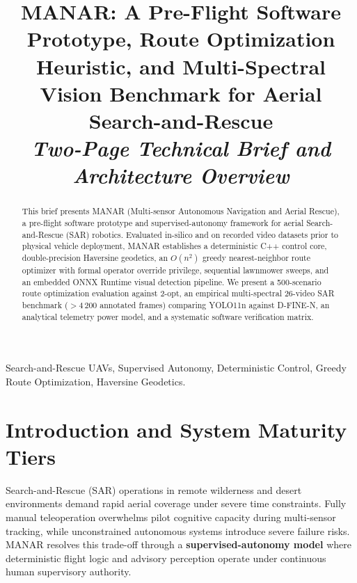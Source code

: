 \documentclass[conference]{IEEEtran}
\begin{document}
\title{MANAR: A Pre-Flight Software Prototype, Route Optimization Heuristic, and Multi-Spectral Vision Benchmark for Aerial Search-and-Rescue\\
\Large\textit{Two-Page Technical Brief and Architecture Overview}}

\author{
}

\maketitle

\begin{abstract}
This brief presents MANAR (Multi-sensor Autonomous Navigation and Aerial Rescue), a pre-flight software prototype and supervised-autonomy framework for aerial Search-and-Rescue (SAR) robotics. Evaluated in-silico and on recorded video datasets prior to physical vehicle deployment, MANAR establishes a deterministic C++ control core, double-precision Haversine geodetics, an $O(n^2)$ greedy nearest-neighbor route optimizer with formal operator override privilege, sequential lawnmower sweeps, and an embedded ONNX Runtime visual detection pipeline. We present a 500-scenario route optimization evaluation against 2-opt, an empirical multi-spectral 26-video SAR benchmark ($>4\,200$ annotated frames) comparing YOLO11n against D-FINE-N, an analytical telemetry power model, and a systematic software verification matrix.
\end{abstract}

\begin{IEEEkeywords}
Search-and-Rescue UAVs, Supervised Autonomy, Deterministic Control, Greedy Route Optimization, Haversine Geodetics.
\end{IEEEkeywords}

\section{Introduction and System Maturity Tiers}
Search-and-Rescue (SAR) operations in remote wilderness and desert environments demand rapid aerial coverage under severe time constraints. Fully manual teleoperation overwhelms pilot cognitive capacity during multi-sensor tracking, while unconstrained autonomous systems introduce severe failure risks. MANAR resolves this trade-off through a \textbf{supervised-autonomy model} where deterministic flight logic and advisory perception operate under continuous human supervisory authority.
\end{document}

